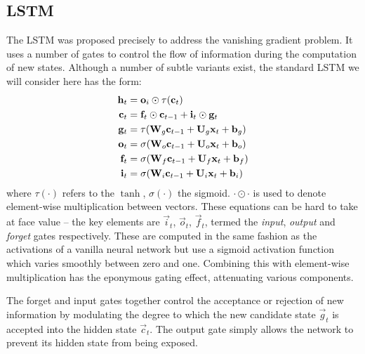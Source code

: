 \subsection{LSTM}
The LSTM was proposed precisely to address the vanishing gradient problem. It uses a number of gates
to control the flow of information during the computation of new states. Although a number
of subtle variants exist, the standard LSTM we will consider here has the form: 
\autocite{Hochreiter1997, Graves2013}
\begin{align}\label{eq:LSTM}
	\mathbf{h}_t &= \mathbf{o}_i \odot \tau(\mathbf{c}_t)\\
	\mathbf{c}_t &= \mathbf{f}_t \odot \mathbf{c}_{t-1} + \mathbf{i}_t \odot \mathbf{g}_t\\
	\mathbf{g}_t &= \tau(\mathbf{W}_g \mathbf{c}_{t-1} + \mathbf{U}_g \mathbf{x}_t + \mathbf{b}_g)\\
	\mathbf{o}_t &= \sigma(\mathbf{W}_o \mathbf{c}_{t-1} + \mathbf{U}_o \mathbf{x}_t + \mathbf{b}_o)\\
	\mathbf{f}_t &= \sigma(\mathbf{W}_f \mathbf{c}_{t-1} + \mathbf{U}_f \mathbf{x}_t + \mathbf{b}_f)\\
	\mathbf{i}_t &= \sigma(\mathbf{W}_i \mathbf{c}_{t-1} + \mathbf{U}_i \mathbf{x}_t + \mathbf{b}_i)
\end{align} where \(\tau(\cdot)\) refers to the \(\tanh\), \(\sigma(\cdot)\) the
sigmoid. \(\cdot \odot \cdot\)
is used to denote element-wise multiplication between vectors. These equations can be hard to take
at face value -- the key elements are \(\vec{i}_t\), \(\vec{o}_t\), \(\vec{f}_t\), termed the
\emph{input}, \emph{output} and \emph{forget} gates respectively. These are computed in the same fashion
as the activations of a vanilla neural network but use a sigmoid activation function which varies
smoothly between zero and one. Combining this with element-wise multiplication has the eponymous
gating effect, attenuating various components. 

The forget and input gates together control the acceptance or rejection of new information by 
modulating the
degree to which the new candidate state \(\vec{g}_t\) is accepted into the hidden state
\(\vec{c}_t\). The output gate simply allows the network to prevent its hidden
state from being exposed. 

